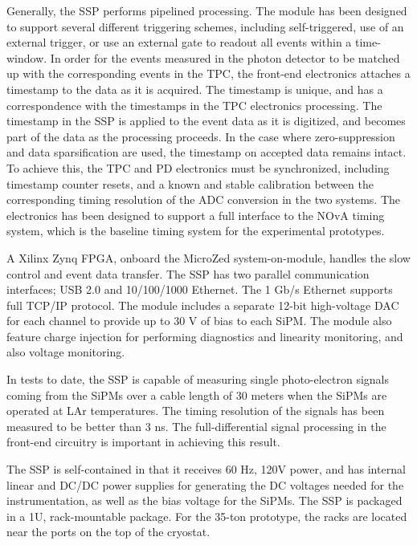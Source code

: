 Generally, the SSP performs pipelined processing.  
The module has been designed to support several different triggering schemes, 
including self-triggered, use of an external trigger, or use an 
external gate to readout all events within a time-window.  
In order for the events measured in the photon detector to be matched up 
with the corresponding events in the TPC, the front-end electronics 
attaches a timestamp to the data as it is acquired.  
The timestamp is unique, and has a correspondence with the timestamps in 
the TPC electronics processing.  
The timestamp in the SSP is applied to the event data as it is digitized, 
and becomes part of the data as the processing proceeds.  
In the case where zero-suppression and data sparsification are used, 
the timestamp on accepted data remains intact.  
To achieve this, the TPC and PD electronics must be synchronized, 
including timestamp counter resets, and a known and stable calibration between 
the corresponding timing resolution of the ADC conversion in the two systems.  
The electronics has been designed to support a full interface to the NOvA 
timing system, which is the baseline timing system for the experimental prototypes.

A Xilinx Zynq FPGA, onboard the MicroZed system-on-module, handles the 
slow control and event data transfer.  
The SSP has two parallel communication interfaces; USB 2.0 and 10/100/1000 Ethernet.  
The 1 Gb/s Ethernet supports full TCP/IP protocol.  
The module includes a separate 12-bit high-voltage DAC for each channel to 
provide up to 30 V of bias to each SiPM.  
The module also feature charge injection for performing diagnostics and linearity 
monitoring, and also voltage monitoring.

In tests to date, the SSP is capable of measuring single photo-electron signals 
coming from the SiPMs over a cable length of 30 meters when the SiPMs are 
operated at LAr temperatures.  
The timing resolution of the signals has been measured to be better than 3 ns.  
The full-differential signal processing in the front-end circuitry 
is important in achieving this result.
 
The SSP is self-contained in that it receives 60 Hz, 120V power, and has internal 
linear and DC/DC power supplies for generating the DC voltages needed for the 
instrumentation, as well as the bias voltage for the SiPMs.  
The SSP is packaged in a 1U, rack-mountable package. For the 35-ton prototype, 
the racks are located near the ports on the top of the cryostat.  

